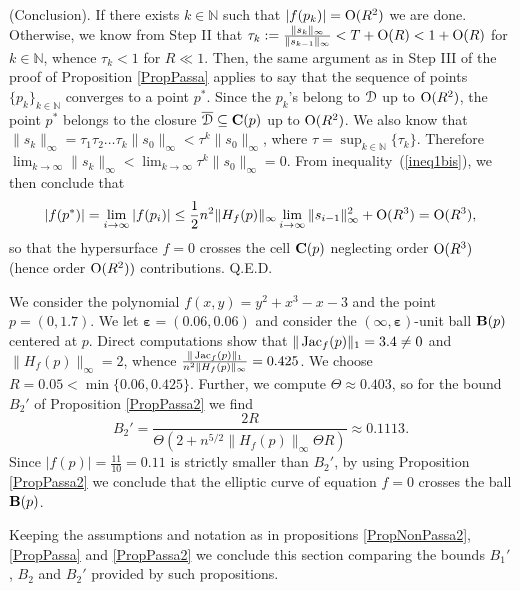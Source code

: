 \documentclass[10pt]{article}
\newcommand\qed{{\hspace*{\fill}Q.E.D.\vskip12pt plus 1pt}}
\newcommand\sD{{\cal D}}
\newcommand\N{{\mathbb N}}
\newcommand{\epsbold}{{\bm \varepsilon}}
\def\Jac{\mathop{\rm Jac}\nolimits}
\newtheorem{examp}[theorem]{Example}
\newenvironment{example*}{\begin{examp}\em}{\end{examp}}
\begin{document}
{ (Conclusion). If there exists $k\in \N$ such that $|f(p_k)|={\rm O}(R^2)$ we are done. Otherwise,
 we know from Step II that $\tau_k:=\frac{ \|s_k\|_\infty}{ \|s_{k-1}\|_\infty}<T +{\rm O}(R)<1+{\rm O}(R)$ for $k\in \N$, whence $\tau_k<1$ for $R\ll1$.  Then, the same argument as in Step III of the proof of Proposition \ref{PropPassa} applies to say that
the sequence of points $\{p_k\}_{k \in \N}$ converges to a point $p^*$. Since the  $p_k$'s belong to $\sD$ up to ${\rm O}(R^2)$, the point $p^*$ belongs to the closure $\overline{\sD}\subseteq {\bf C}(p)$ up to ${\rm O}(R^2)$.
We also know that $\| s_k\|_\infty=\tau_1\tau_2\ldots\tau_k\|s_0\|_\infty<\tau^k\|s_0\|_\infty$, where $\tau=\sup_{k\in \N}\{\tau_k\}$. Therefore $\lim_{k\to \infty}\|s_k\|_\infty< \lim_{k\to \infty}\tau^k\|s_0\|_\infty=0$.
From  inequality~(\ref{ineq1bis}), 
 we then conclude that 
$$|f(p^*)|=\lim_{i\to \infty} |f(p_i)|\le\frac{1}{2} n^2 \|H_f(p)\|_\infty \lim_{i\to\infty}\|s_{i-1}\|_\infty^2 + {\rm O}(R^3)={\rm O}(R^3),$$  so that the hypersurface $f=0$ crosses the cell ${\bf C}(p)$  neglecting  order ${\rm O}( R^3)$ (hence order ${\rm O}(R^2))$ contributions.  \qed

\begin{example*}\label{EE}
We consider the polynomial $f(x,y)=y^2+x^3-x-3$ and the point 
$p=(0, 1.7)$.
We let $\epsbold =(0.06,0.06)$ and consider the
$(\infty,\epsbold)$-unit ball   ${\bf B}(p)$ centered at $p$.
Direct computations show that $\|\Jac_f(p)\|_1=3.4 \neq 0$ and
$\|H_f(p)\|_\infty=2$, whence $\frac{\|\Jac_f(p)\|_1}{n^2 \|H_f(p)\|_\infty }=0.425$.
 We choose $R=0.05 < \min\{0.06, 0.425\}$.
Further, we compute $\Theta \approx 0.403$, so for the bound $B_2'$ 
of Proposition \ref{PropPassa2}  we find  
 $$
 B_2' = \frac{2R}{\Theta (2+ n^{5/2}\|H_f(p)\|_\infty \Theta R)} \approx 0.1113.
$$
Since $|f(p)|=\frac{11}{10}=0.11$ is strictly smaller than $B_2'$, 
by using Proposition \ref{PropPassa2} we conclude that the elliptic
curve of equation $f=0$ crosses the  ball ${\bf B}(p)$. 
\end{example*}



Keeping the assumptions and notation as in propositions \ref{PropNonPassa2},  \ref{PropPassa} and \ref{PropPassa2}
we conclude this section 
comparing the bounds $B_1'$, $B_2$ and $B_2'$ provided by such propositions.

}
\end{document}
